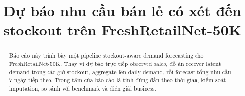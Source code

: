 \documentclass[12pt,a4paper]{report}
\title{Dự báo nhu cầu bán lẻ có xét đến stockout trên FreshRetailNet-50K}
\author{}
\date{}
\begin{document}
\maketitle

\begin{abstract}
Báo cáo này trình bày một pipeline stockout-aware demand forecasting cho FreshRetailNet-50K. Thay vì dự báo trực tiếp observed sales, đồ án recover latent demand trong các giờ stockout, aggregate lên daily demand, rồi forecast tổng nhu cầu 7 ngày tiếp theo. Trọng tâm của báo cáo là tính đúng đắn theo thời gian, kiểm soát imputation, so sánh với benchmark và diễn giải business.
\end{abstract}

\tableofcontents
\listoffigures
\listoftables
\clearpage
{}












\end{document}

